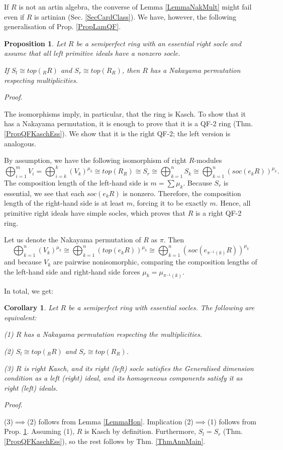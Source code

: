 \documentclass[11pt]{article}
\theoremstyle{plain}
\newtheorem{Prop}[veta]{Proposition}
\newtheorem{Cor}[veta]{Corollary}
\theoremstyle{remark}
\theoremstyle{plain}
\newenvironment{Proof}{
  \par\medskip\noindent
  \textit{Proof}.
}{
\newline
\rightline{$\qedsymbol$}
}
\begin{document}
If $R$ is not an artin algebra, the converse of Lemma \ref{LemmaNakMult} might fail even if $R$ is artinian (Sec. \ref{SecCardClass}). We have, however, the following generalisation of Prop. \ref{PropLamQF}.
\begin{Prop}\label{PropHon}
Let $R$ be a semiperfect ring with an essential right socle and assume that all left primitive ideals have a nonzero socle.

If $S_l\cong top(_RR)$ and $S_r\cong top(R_R)$, then $R$ has a Nakayama permutation respecting multiplicities.     
\end{Prop}
\begin{Proof}
    The isomorphisms imply, in particular, that the ring is Kasch. To show that it has a Nakayama permutation, it is enough to prove that it is a QF-2 ring (Thm. \ref{PropQFKaschEss}). We show that it is the right QF-2; the left version is analogous.
    
    By assumption, we have the following isomorphism of right $R$-modules
\[\bigoplus_{i=1}^mV_i=\bigoplus_{i=k}^k (V_k)^{\mu_k}\cong top(R_R)\cong S_r\cong \bigoplus_{k=1}^n S_k\cong \bigoplus_{k=1}^n (soc(e_kR))^{\mu_{k}}.\]
 The composition length of the left-hand side is $m=\sum \mu_k$. Because $S_r$ is essential, we see that each $soc(e_kR)$ is nonzero. Therefore, the composition length of the right-hand side is at least $m$, forcing it to be exactly $m$. Hence, all primitive right ideals have simple socles, which proves that $R$ is a right QF-2 ring.  

Let us denote the Nakayama permutation of $R$ as $\pi$. Then 
\[\bigoplus_{k=1}^n (V_k)^{\mu_k}\cong  \bigoplus_{k=1}^n (top(e_kR))^{\mu_k} \cong \bigoplus_{k=1}^n (soc(e_{\pi^{-1}(k)}R))^{\mu_k} \]
and because $V_k$ are pairwise nonisomorphic, comparing the composition lengths of the left-hand side and right-hand side forces $\mu_k=\mu_{\pi^{-1}(k)}$.
\end{Proof}
In total, we get:
\begin{Cor}\label{CorCardmain}
Let $R$ be a semiperfect ring with essential socles. The following are equivalent:

(1) $R$ has a Nakayama permutation respecting the multiplicities.

(2) $S_l\cong top(_RR)$ and $S_r\cong top(R_R)$.

(3) $R$ is right Kasch, and its right (left) socle satisfies the Generalised dimension condition as a left (right) ideal, and its homogeneous components satisfy it as right (left) ideals.
\end{Cor}
\begin{Proof}
(3)$\implies$(2) follows from Lemma \ref{LemmaHon}. Implication (2)$\implies$(1) follows from Prop. \ref{PropHon}. Assuming (1), $R$ is Kasch by definition. Furthermore, $S_l=S_r$ (Thm. \ref{PropQFKaschEss}), so the rest follows by  Thm.  \ref{ThmAnnMain}.
\end{Proof}
\end{document}
